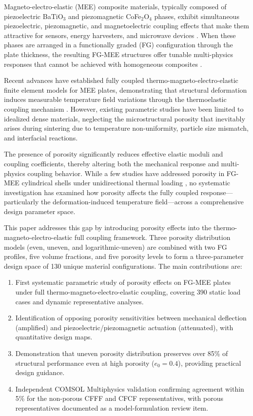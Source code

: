 \documentclass[11pt,a4paper]{article}
\begin{document}
Magneto-electro-elastic (MEE) composite materials, typically composed of piezoelectric BaTiO$_3$ and piezomagnetic CoFe$_2$O$_4$ phases, exhibit simultaneous piezoelectric, piezomagnetic, and magnetoelectric coupling effects that make them attractive for sensors, energy harvesters, and microwave devices \citep{nan2008multiferroic}. When these phases are arranged in a functionally graded (FG) configuration through the plate thickness, the resulting FG-MEE structures offer tunable multi-physics responses that cannot be achieved with homogeneous composites \citep{kondaiah2012studies}.

Recent advances have established fully coupled thermo-magneto-electro-elastic finite element models for MEE plates, demonstrating that structural deformation induces measurable temperature field variations through the thermoelastic coupling mechanism \citep{zhang2026}. However, existing parametric studies have been limited to idealized dense materials, neglecting the microstructural porosity that inevitably arises during sintering due to temperature non-uniformity, particle size mismatch, and interfacial reactions.

The presence of porosity significantly reduces effective elastic moduli and coupling coefficients, thereby altering both the mechanical response and multi-physics coupling behavior. While a few studies have addressed porosity in FG-MEE cylindrical shells under unidirectional thermal loading \citep{zhao2024}, no systematic investigation has examined how porosity affects the fully coupled response---particularly the deformation-induced temperature field---across a comprehensive design parameter space.

This paper addresses this gap by introducing porosity effects into the thermo-magneto-electro-elastic full coupling framework. Three porosity distribution models (even, uneven, and logarithmic-uneven) are combined with two FG profiles, five volume fractions, and five porosity levels to form a three-parameter design space of 130 unique material configurations. The main contributions are:

\begin{enumerate}[leftmargin=2em]
\item First systematic parametric study of porosity effects on FG-MEE plates under full thermo-magneto-electro-elastic coupling, covering 390 static load cases and dynamic representative analyses.
\item Identification of opposing porosity sensitivities between mechanical deflection (amplified) and piezoelectric/piezomagnetic actuation (attenuated), with quantitative design maps.
\item Demonstration that uneven porosity distribution preserves over 85\% of structural performance even at high porosity ($e_0 = 0.4$), providing practical design guidance.
\item Independent COMSOL Multiphysics validation confirming agreement within 5\% for the non-porous CFFF and CFCF representatives, with porous representatives documented as a model-formulation review item.
\end{enumerate}
\end{document}
